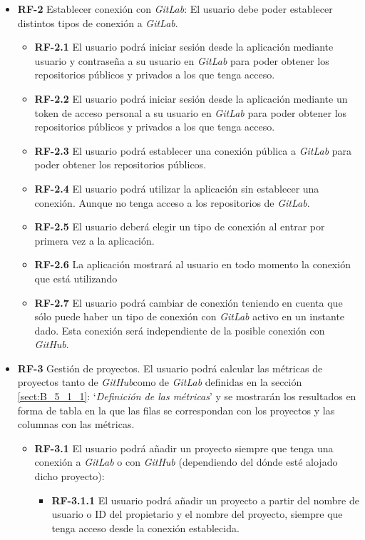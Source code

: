 \begin{itemize}
\begin{itemize}
	\end{itemize}
	\item \textbf{RF-2} Establecer conexión con \textit{GitLab}: El usuario debe poder establecer distintos tipos de conexión a \textit{GitLab}.
	\begin{itemize}
		\item \textbf{RF-2.1} El usuario podrá iniciar sesión desde la aplicación mediante usuario y contraseña a su usuario en \textit{GitLab} para poder obtener los repositorios públicos y privados a los que tenga acceso.
		\item \textbf{RF-2.2} El usuario podrá iniciar sesión desde la aplicación mediante un token de acceso personal a su usuario en \textit{GitLab} para poder obtener los repositorios públicos y privados a los que tenga acceso.
		\item \textbf{RF-2.3} El usuario podrá establecer una conexión pública a \textit{GitLab} para poder obtener los repositorios públicos.
		\item \textbf{RF-2.4} El usuario podrá utilizar la aplicación sin establecer una conexión. Aunque no tenga acceso a los repositorios de \textit{GitLab}.
		\item \textbf{RF-2.5} El usuario deberá elegir un tipo de conexión al entrar por primera vez a la aplicación.
		\item \textbf{RF-2.6} La aplicación mostrará al usuario en todo momento la conexión que está utilizando
		\item \textbf{RF-2.7} El usuario podrá cambiar de conexión teniendo en cuenta que sólo puede haber un tipo de conexión con \textit{GitLab} activo en un instante dado. Esta conexión será independiente de la posible conexión con \textit{GitHub}.
	\end{itemize}
	\item \textbf{RF-3} Gestión de proyectos. El usuario podrá calcular las métricas de proyectos tanto de \textit{GitHub}como de \textit{GitLab} definidas en la sección \ref{sect:B_5_1_1}: `\textit{Definición de las métricas}' y se mostrarán los resultados en forma de tabla en la que las filas se correspondan con los proyectos y las columnas con las métricas.
	\begin{itemize}
		\item \textbf{RF-3.1} El usuario podrá añadir un proyecto siempre que tenga una conexión a \textit{GitLab} o con \textit{GitHub} (dependiendo del dónde esté alojado dicho proyecto):
		\begin{itemize}
			\item \textbf{RF-3.1.1} El usuario podrá añadir un proyecto a partir del nombre de usuario o ID del propietario y el nombre del proyecto, siempre que tenga acceso desde la conexión establecida.

\end{itemize}
\end{itemize}
\end{itemize}
